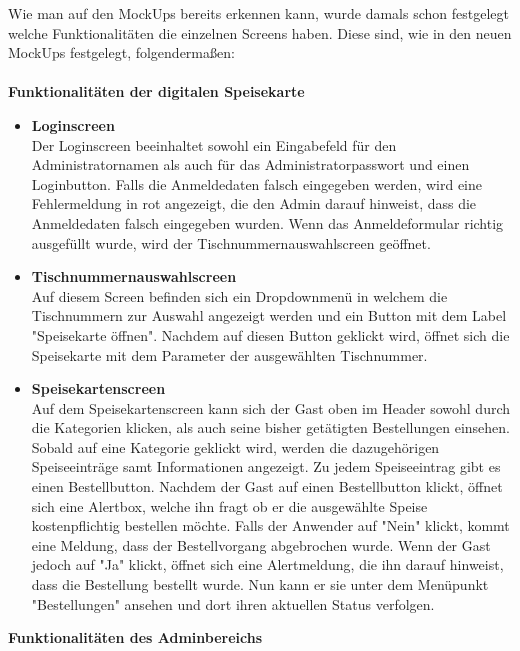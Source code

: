 Wie man auf den MockUps bereits erkennen kann, wurde damals schon festgelegt welche Funktionalitäten die einzelnen Screens haben.
Diese sind, wie in den neuen MockUps festgelegt, folgendermaßen:\\ \\
\textbf{Funktionalitäten der digitalen Speisekarte}
\begin{itemize}
    \item \textbf{Loginscreen}\\
Der Loginscreen beeinhaltet sowohl ein Eingabefeld für den Administratornamen als auch für das Administratorpasswort und einen Loginbutton.
Falls die Anmeldedaten falsch eingegeben werden, wird eine Fehlermeldung in rot angezeigt, die den Admin darauf hinweist, dass die Anmeldedaten falsch eingegeben wurden.
Wenn das Anmeldeformular richtig ausgefüllt wurde, wird der Tischnummernauswahlscreen geöffnet.
    \item \textbf{Tischnummernauswahlscreen}\\
Auf diesem Screen befinden sich ein Dropdownmenü in welchem die Tischnummern zur Auswahl angezeigt werden und ein Button mit dem Label "Speisekarte öffnen". Nachdem auf diesen Button geklickt wird, öffnet sich die Speisekarte mit dem Parameter der ausgewählten Tischnummer.
    \item \textbf{Speisekartenscreen}\\
Auf dem Speisekartenscreen kann sich der Gast oben im Header sowohl durch die Kategorien klicken, als auch seine bisher getätigten Bestellungen einsehen.
Sobald auf eine Kategorie geklickt wird, werden die dazugehörigen Speiseeinträge samt Informationen angezeigt. Zu jedem Speiseeintrag gibt es einen Bestellbutton.
Nachdem der Gast auf einen Bestellbutton klickt, öffnet sich eine Alertbox, welche ihn fragt ob er die ausgewählte Speise kostenpflichtig bestellen möchte. Falls der Anwender auf "Nein" klickt, kommt eine Meldung, dass der Bestellvorgang abgebrochen wurde.
Wenn der Gast jedoch auf "Ja" klickt, öffnet sich eine Alertmeldung, die ihn darauf hinweist, dass die Bestellung bestellt wurde. Nun kann er sie unter dem Menüpunkt "Bestellungen" ansehen und dort ihren aktuellen Status verfolgen.\\
  \end{itemize}
\textbf{Funktionalitäten des Adminbereichs}
